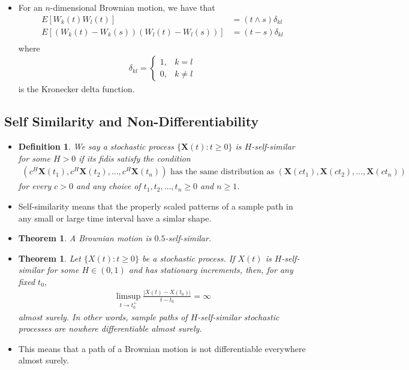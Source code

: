 \documentclass[10pt]{article}
\newtheorem{theorem}[lemma]{Theorem}
\newtheorem{definition}[lemma]{Definition}
\newcommand{\ve}[1]{\mathbf{#1}}
\begin{document}
\begin{itemize}
  \item For an $n$-dimensional Brownian motion, we have that
  \begin{align*}
    E[W_k(t)W_l(t)] &= (t \wedge s)\delta_{kl} \\
    E[(W_k(t) - W_k(s))(W_l(t) - W_l(s))] &= (t - s)\delta_{kl} \\
  \end{align*}
  where 
  \begin{align*}
    \delta_{kl} = \begin{cases}
      1, & k = l \\
      0, & k \neq l
    \end{cases}
  \end{align*}
  is the Kronecker delta function.    
\end{itemize}

\subsection{Self Similarity and Non-Differentiability}

\begin{itemize}
  \item \begin{definition}
    We say a stochastic process $\{ \ve{X}(t) : t \geq 0 \}$ is $H$-self-similar for some $H > 0$ if its fidis satisfy the condition
    \begin{align*}
      (c^H \ve{X}(t_1), c^H \ve{X}(t_2), \dotsc, c^H \ve{X}(t_n)) \mbox{ has the same distribution as } (\ve{X}(ct_1), \ve{X}(ct_2), \dotsc, \ve{X}(ct_n))
    \end{align*}
    for every $c > 0$ and any choice of $t_1, t_2, \dotsc, t_n \geq 0$ and $n \geq 1$.
  \end{definition}

  \item Self-similarity means that the properly scaled patterns of a sample path in any small or large time interval have a simlar shape.

  \item \begin{theorem}
    A Brownian motion is $0.5$-self-similar.
  \end{theorem}
  
  \item \begin{theorem}
    Let $\{ X(t) : t \geq 0 \}$ be a stochastic process. If $X(t)$ is $H$-self-similar for some $H \in (0,1)$ and has stationary increments, then, for any fixed $t_0$,
    \begin{align*}
      \limsup_{t \rightarrow t_0^+} \frac{|X(t) - X(t_0)|}{t-t_0} = \infty
    \end{align*}
    almost surely. In other words, sample paths of $H$-self-similar stochastic processes are nowhere differentiable almost surely.
  \end{theorem}
  
  \item This means that a path of a Brownian motion is not differentiable everywhere almost surely.
\end{itemize}
\end{document}
